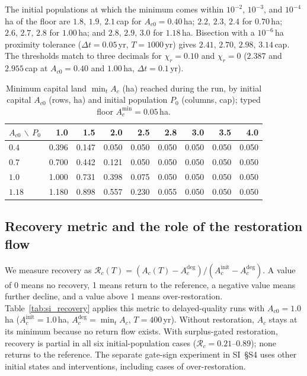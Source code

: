 \documentclass[11pt,a4paper]{article}
\newcommand{\Acmin}{A_c^{\min}}
\begin{document}
The initial populations at which the minimum comes within $10^{-2}$, $10^{-3}$, and $10^{-4}$\,ha of the floor are $1.8,\,1.9,\,2.1$\,cap for $A_{c0}=0.40$\,ha; $2.2,\,2.3,\,2.4$ for $0.70$\,ha; $2.6,\,2.7,\,2.8$ for $1.00$\,ha; and $2.8,\,2.9,\,3.0$ for $1.18$\,ha. Bisection with a $10^{-6}$\,ha proximity tolerance ($\Delta t=0.05$\,yr, $T=1000$\,yr) gives $2.41,\,2.70,\,2.98,\,3.14$\,cap. The thresholds match to three decimals for $\chi_r=0.10$ and $\chi_r=0$ ($2.387$ and $2.955$\,cap at $A_{c0}=0.40$ and $1.00$\,ha, $\Delta t=0.1$\,yr). \par\pagebreak

\begin{table}[htbp]
\centering\small
\caption{Minimum capital land $\min_tA_c$ (ha) reached during the run, by initial capital $A_{c0}$ (rows, ha) and initial population $P_0$ (columns, cap); typed floor $\Acmin=0.05$\,ha.}
\label{tab:si_drawdown}
\begin{tabular}{lrrrrrrrr}
\toprule
$A_{c0}$ $\backslash$ $P_0$ & 1.0 & 1.5 & 2.0 & 2.5 & 2.8 & 3.0 & 3.5 & 4.0 \\
\midrule
$0.4$ & 0.396 & 0.147 & 0.050 & 0.050 & 0.050 & 0.050 & 0.050 & 0.050 \\
$0.7$ & 0.700 & 0.442 & 0.121 & 0.050 & 0.050 & 0.050 & 0.050 & 0.050 \\
$1.0$ & 1.000 & 0.731 & 0.398 & 0.075 & 0.050 & 0.050 & 0.050 & 0.050 \\
$1.18$ & 1.180 & 0.898 & 0.557 & 0.230 & 0.055 & 0.050 & 0.050 & 0.050 \\
\bottomrule
\end{tabular}
\end{table}

\subsection{Recovery metric and the role of the restoration flow}\label{si:recovery}

We measure recovery as $\mathcal R_c(T)=(A_c(T)-A_c^{\mathrm{deg}})/(A_c^{\mathrm{init}}-A_c^{\mathrm{deg}})$. A value of 0 means no recovery, 1 means return to the reference, a negative value means further decline, and a value above 1 means over-restoration. Table~\ref{tab:si_recovery} applies this metric to delayed-quality runs with $A_{c0}=1.0$\,ha ($A_c^{\mathrm{init}}=1.0$\,ha, $A_c^{\mathrm{deg}}=\min_tA_c$, $T=400$\,yr). Without restoration, $A_c$ stays at its minimum because no return flow exists. With surplus-gated restoration, recovery is partial in all six initial-population cases ($\mathcal R_c=0.21$--$0.89$); none returns to the reference. The separate gate-sign experiment in SI~\S S4 uses other initial states and interventions, including cases of over-restoration.
\end{document}
